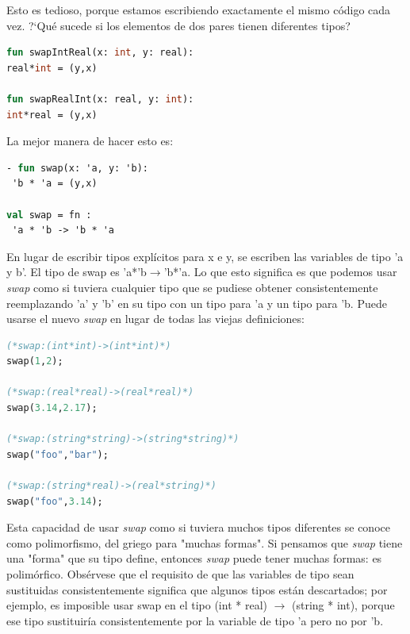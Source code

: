 \documentclass[10pt,journal,compsoc]{IEEEtran}
\begin{document}
Esto es tedioso, porque estamos escribiendo exactamente el mismo c\'odigo cada vez. ?`Qu\'e sucede si los elementos de dos pares tienen diferentes tipos?

\begin{lstlisting}[language=ML, caption=Ejemplo Polimorfismo 2]
fun swapIntReal(x: int, y: real):
real*int = (y,x)

fun swapRealInt(x: real, y: int):
int*real = (y,x)
\end{lstlisting}

La mejor manera de hacer esto es:

\begin{lstlisting}[language=ML, caption=Ejemplo Polimorfismo correcto]
- fun swap(x: 'a, y: 'b):
 'b * 'a = (y,x)
 
val swap = fn :
 'a * 'b -> 'b * 'a
\end{lstlisting}

En lugar de escribir tipos expl\'icitos para x e y, se escriben las variables de tipo 'a y b'. El tipo de swap es 'a*'b$\rightarrow$'b*'a. Lo que esto significa es que podemos usar \textit{swap} como si tuviera cualquier tipo que se pudiese obtener consistentemente reemplazando 'a' y 'b' en su tipo con un tipo para 'a y un tipo para 'b. Puede usarse el nuevo \textit{swap} en lugar de todas las viejas definiciones:

\begin{lstlisting}[language=ML, caption=Ejemplo Polimorfismo con definiciones antiguas]
(*swap:(int*int)->(int*int)*)
swap(1,2);

(*swap:(real*real)->(real*real)*)
swap(3.14,2.17);

(*swap:(string*string)->(string*string)*)
swap("foo","bar");  

(*swap:(string*real)->(real*string)*)
swap("foo",3.14);   
\end{lstlisting}

Esta capacidad de usar \textit{swap} como si tuviera muchos tipos diferentes se conoce como polimorfismo, del griego para "muchas formas". Si pensamos que \textit{swap} tiene una "forma" que su tipo define, entonces \textit{swap} puede tener muchas formas: es polim\'orfico. Obs\'ervese que el requisito de que las variables de tipo sean sustituidas consistentemente significa que algunos tipos est\'an descartados; por ejemplo, es imposible usar swap en el tipo (int * real) $\rightarrow$ (string * int), porque ese tipo sustituir\'ia consistentemente por la variable de tipo 'a pero no por 'b.
\end{document}

